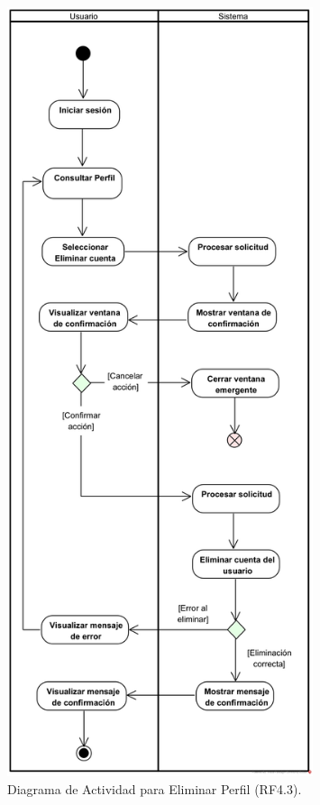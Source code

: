 \begin{figure}[H]
	\centering
	\caption{Diagrama de Actividad para Eliminar Perfil (RF4.3).}
 \includegraphics[width=0.8\textwidth]{UML/Actividad/Diagrama de Actividad RF4.3 Eliminar Perfil.png}
\end{figure}


